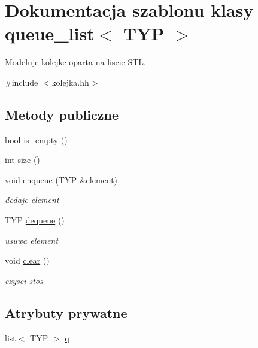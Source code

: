\hypertarget{classqueue__list}{\section{\-Dokumentacja szablonu klasy queue\-\_\-list$<$ \-T\-Y\-P $>$}
\label{classqueue__list}
}


\-Modeluje kolejke oparta na liscie \-S\-T\-L.  




{\ttfamily \#include $<$kolejka.\-hh$>$}

\subsection*{\-Metody publiczne}
\begin{DoxyCompactItemize}
\item 
bool \hyperlink{classqueue__list_a762d9f9f56dc9552e8df07d1b732e8b0}{is\-\_\-empty} ()
\item 
int \hyperlink{classqueue__list_aa9d1aaf18cca43fcee4e0a0dfb212cd4}{size} ()
\item 
void \hyperlink{classqueue__list_ab2985d4f0192202336311fd89d836573}{enqueue} (\-T\-Y\-P \&element)
\begin{DoxyCompactList}\small\item\em dodaje element \end{DoxyCompactList}\item 
\-T\-Y\-P \hyperlink{classqueue__list_add17ee76e80f7e09cc470ba55bd4c131}{dequeue} ()
\begin{DoxyCompactList}\small\item\em usuwa element \end{DoxyCompactList}\item 
void \hyperlink{classqueue__list_a4dcb6bb4dfee45fb084dff647ded82f0}{clear} ()
\begin{DoxyCompactList}\small\item\em czysci stos \end{DoxyCompactList}\end{DoxyCompactItemize}
\subsection*{\-Atrybuty prywatne}
\begin{DoxyCompactItemize}
\item 
list$<$ \-T\-Y\-P $>$ \hyperlink{classqueue__list_a452a11e2c4872ff7b6622d06e6d01c98}{q}
\end{DoxyCompactItemize}


